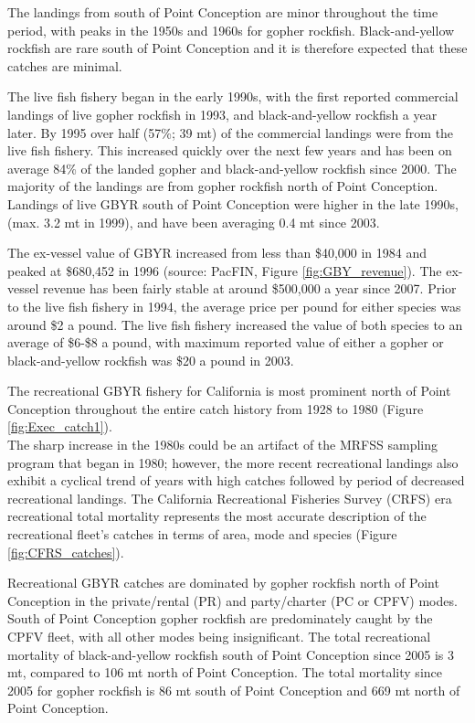\documentclass[12pt,]{article}
\begin{document}
The landings from south of Point Conception are minor throughout the
time period, with peaks in the 1950s and 1960s for gopher rockfish.
Black-and-yellow rockfish are rare south of Point Conception and it is
therefore expected that these catches are minimal.

The live fish fishery began in the early 1990s, with the first reported
commercial landings of live gopher rockfish in 1993, and
black-and-yellow rockfish a year later. By 1995 over half (57\%; 39 mt)
of the commercial landings were from the live fish fishery. This
increased quickly over the next few years and has been on average 84\%
of the landed gopher and black-and-yellow rockfish since 2000. The
majority of the landings are from gopher rockfish north of Point
Conception. Landings of live GBYR south of Point Conception were higher
in the late 1990s, (max. 3.2 mt in 1999), and have been averaging 0.4 mt
since 2003.

The ex-vessel value of GBYR increased from less than \$40,000 in 1984
and peaked at \$680,452 in 1996 (source: PacFIN, Figure
\ref{fig:GBY_revenue}). The ex-vessel revenue has been fairly stable at
around \$500,000 a year since 2007. Prior to the live fish fishery in
1994, the average price per pound for either species was around \$2 a
pound. The live fish fishery increased the value of both species to an
average of \$6-\$8 a pound, with maximum reported value of either a
gopher or black-and-yellow rockfish was \$20 a pound in 2003.

The recreational GBYR fishery for California is most prominent north of
Point Conception throughout the entire catch history from 1928 to 1980
(Figure \ref{fig:Exec_catch1}).\\
The sharp increase in the 1980s could be an artifact of the MRFSS
sampling program that began in 1980; however, the more recent
recreational landings also exhibit a cyclical trend of years with high
catches followed by period of decreased recreational landings. The
California Recreational Fisheries Survey (CRFS) era recreational total
mortality represents the most accurate description of the recreational
fleet's catches in terms of area, mode and species (Figure
\ref{fig:CFRS_catches}).

Recreational GBYR catches are dominated by gopher rockfish north of
Point Conception in the private/rental (PR) and party/charter (PC or
CPFV) modes. South of Point Conception gopher rockfish are predominately
caught by the CPFV fleet, with all other modes being insignificant. The
total recreational mortality of black-and-yellow rockfish south of Point
Conception since 2005 is 3 mt, compared to 106 mt north of Point
Conception. The total mortality since 2005 for gopher rockfish is 86 mt
south of Point Conception and 669 mt north of Point Conception.
\end{document}
